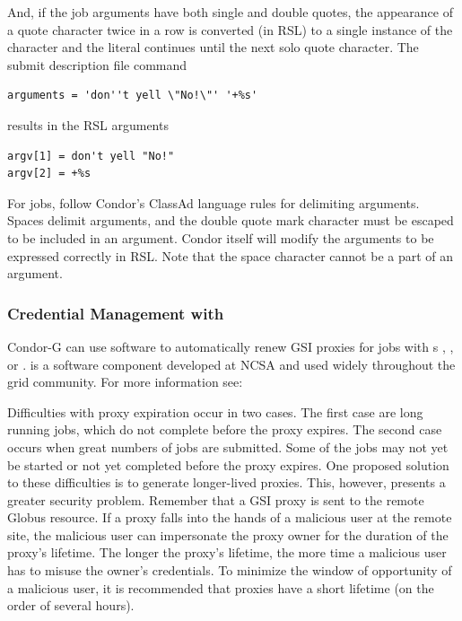 And, if the job arguments have both single and double quotes,
the appearance of a quote character twice in a
row is converted (in RSL) to a single instance of the character and the literal
continues until the next solo quote character.
The submit description file command 
\footnotesize
\begin{verbatim}
arguments = 'don''t yell \"No!\"' '+%s'
\end{verbatim}
\normalsize
results in the RSL arguments
\begin{verbatim}
argv[1] = don't yell "No!"
argv[2] = +%s
\end{verbatim}

For   jobs,
follow Condor's ClassAd language rules for delimiting arguments.
Spaces delimit arguments,
and the double quote mark character must be escaped to be included
in an argument.
Condor itself will modify the arguments to be expressed correctly
in RSL.
Note that the space character cannot be a part of an argument.

\subsubsection{\label{sec:My-Proxy}Credential Management with }
Condor-G can use 
software to automatically renew GSI proxies for
 jobs with s
,
,
or
.
 is a software component developed at
NCSA and used widely throughout the grid community.
For more information see:

Difficulties with proxy expiration occur in two cases.
The first case are long running jobs, which do not complete
before the proxy expires.
The second case occurs when great numbers of jobs are submitted.
Some of the jobs may not yet be started
or not yet completed before the proxy expires.
One proposed solution to these difficulties is to generate
longer-lived proxies.
This, however, presents a greater security problem.
Remember that a GSI proxy is sent to the remote Globus resource.
If a proxy falls into the hands of a malicious user at the remote site,
the malicious user can impersonate the proxy owner
for the duration of the proxy's lifetime.
The longer the proxy's lifetime,
the more time a malicious user has to misuse the owner's credentials.
To minimize the
window of opportunity of a
malicious user, 
it is recommended that proxies have a short lifetime
(on the order of several hours).

